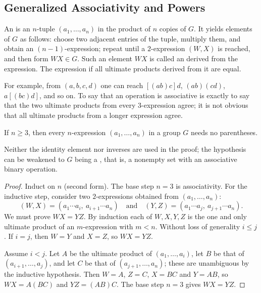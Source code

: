 \subsection{Generalized Associativity and Powers}

\begin{definition}
	An  is an \(n\)-tuple \((a_1, \dots, a_n)\) in the product of
	\(n\) copies of \(G\). It yields elements of \(G\) as follows: choose two adjacent
	entries of the tuple, multiply them, and
	obtain an \((n-1)\)-expression; repeat until a \(2\)-expression \((W,X)\) is reached,
	and then form \(WX \in G\). Such an element \(WX\) is called an  derived from the expression. The expression  if
	all ultimate products derived from it are equal.
\end{definition}

For example, from \((a,b,c,d)\) one can reach \([(ab)c]d\), \((ab)(cd)\), \(a[(bc)d]\),
and so on. To say that an operation is associative is exactly to say that the two ultimate
products from every \(3\)-expression agree; it is not obvious that all ultimate products
from a longer expression agree.

\begin{theorem}\label{thm:gen-assoc}
	If \(n \geq 3\), then every \(n\)-expression \((a_1, \dots, a_n)\) in a group \(G\)
	needs no parentheses.
\end{theorem}

\begin{remark}
	Neither the identity element nor inverses are used in the proof; the hypothesis can be
	weakened to \(G\) being a , that is, a nonempty set with an associative
	binary operation.
\end{remark}

\begin{proof}
	Induct on \(n\) (second form). The base step \(n = 3\) is associativity. For the
	inductive step, consider two \(2\)-expressions obtained from \((a_1, \dots, a_n)\):
	\[
		(W, X) = (a_1\cdots a_i,\ a_{i+1}\cdots a_n)
		\quad\text{and}\quad
		(Y, Z) = (a_1\cdots a_j,\ a_{j+1}\cdots a_n).
	\]
	We must prove \(WX = YZ\). By induction each of \(W, X, Y, Z\) is the one and only
	ultimate product of an \(m\)-expression with \(m < n\). Without loss of generality
	\(i \leq j\). If \(i = j\), then \(W = Y\) and \(X = Z\), so \(WX = YZ\).

	Assume \(i < j\). Let \(A\) be the ultimate product of \((a_1, \dots, a_i)\), let \(B\)
	be that of \((a_{i+1}, \dots, a_j)\), and let \(C\) be that of
	\((a_{j+1}, \dots, a_n)\); these are unambiguous by the inductive hypothesis. Then
	\(W = A\), \(Z = C\), \(X = BC\) and \(Y = AB\), so \(WX = A(BC)\) and
	\(YZ = (AB)C\). The base step \(n = 3\) gives \(WX = YZ\).
\end{proof}

